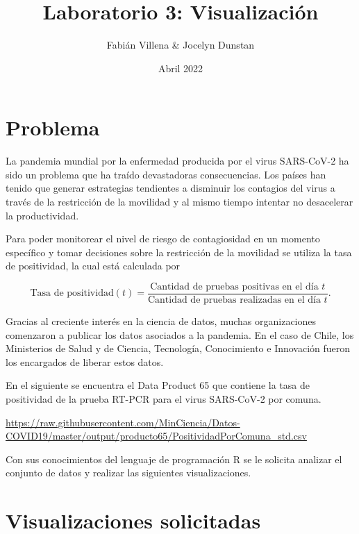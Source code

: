 \documentclass{article}
\title{Laboratorio 3: Visualización}
\author{Fabián Villena \& Jocelyn Dunstan}
\date{Abril 2022}
\begin{document}
\maketitle

\section{Problema}

La pandemia mundial por la enfermedad producida por el virus SARS-CoV-2 ha sido un problema que ha traído devastadoras consecuencias. Los países han tenido que generar estrategias tendientes a disminuir los contagios del virus a través de la restricción de la movilidad y al mismo tiempo intentar no desacelerar la productividad.

Para poder monitorear el nivel de riesgo de contagiosidad en un momento específico y tomar decisiones sobre la restricción de la movilidad se utiliza la tasa de positividad, la cual está calculada por 

\begin{equation}
\textrm{Tasa de positividad}(t) = \frac{\textrm{Cantidad de pruebas positivas en el día } t}{\textrm{Cantidad de pruebas realizadas en el día } t}.
\end{equation}

Gracias al creciente interés en la ciencia de datos, muchas organizaciones comenzaron a publicar los datos asociados a la pandemia. En el caso de Chile, los Ministerios de Salud y de Ciencia, Tecnología, Conocimiento e Innovación fueron los encargados de liberar estos datos.

En el siguiente se encuentra el Data Product 65 que contiene la tasa de positividad de la prueba RT-PCR para el virus SARS-CoV-2 por comuna.

\begin{center}
    \url{https://raw.githubusercontent.com/MinCiencia/Datos-COVID19/master/output/producto65/PositividadPorComuna_std.csv}
\end{center}

Con sus conocimientos del lenguaje de programación R se le solicita analizar el conjunto de datos y realizar las siguientes visualizaciones.

\section{Visualizaciones solicitadas}
\end{document}
